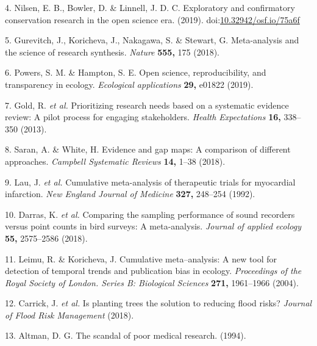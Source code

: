 \documentclass[]{article}
\begin{document}
\leavevmode\hypertarget{ref-nilsen_bowler_linnell_2019}{}%
4. Nilsen, E. B., Bowler, D. \& Linnell, J. D. C. Exploratory and
confirmatory conservation research in the open science era. (2019).
doi:\href{https://doi.org/10.32942/osf.io/75a6f}{10.32942/osf.io/75a6f}

\leavevmode\hypertarget{ref-gurevitch2018meta}{}%
5. Gurevitch, J., Koricheva, J., Nakagawa, S. \& Stewart, G.
Meta-analysis and the science of research synthesis. \emph{Nature}
\textbf{555,} 175 (2018).

\leavevmode\hypertarget{ref-powers2019open}{}%
6. Powers, S. M. \& Hampton, S. E. Open science, reproducibility, and
transparency in ecology. \emph{Ecological applications} \textbf{29,}
e01822 (2019).

\leavevmode\hypertarget{ref-gold2013prioritizing}{}%
7. Gold, R. \emph{et al.} Prioritizing research needs based on a
systematic evidence review: A pilot process for engaging stakeholders.
\emph{Health Expectations} \textbf{16,} 338--350 (2013).

\leavevmode\hypertarget{ref-saran2018evidence}{}%
8. Saran, A. \& White, H. Evidence and gap maps: A comparison of
different approaches. \emph{Campbell Systematic Reviews} \textbf{14,}
1--38 (2018).

\leavevmode\hypertarget{ref-lau1992cumulative}{}%
9. Lau, J. \emph{et al.} Cumulative meta-analysis of therapeutic trials
for myocardial infarction. \emph{New England Journal of Medicine}
\textbf{327,} 248--254 (1992).

\leavevmode\hypertarget{ref-darras2018comparing}{}%
10. Darras, K. \emph{et al.} Comparing the sampling performance of sound
recorders versus point counts in bird surveys: A meta-analysis.
\emph{Journal of applied ecology} \textbf{55,} 2575--2586 (2018).

\leavevmode\hypertarget{ref-leimu2004cumulative}{}%
11. Leimu, R. \& Koricheva, J. Cumulative meta--analysis: A new tool for
detection of temporal trends and publication bias in ecology.
\emph{Proceedings of the Royal Society of London. Series B: Biological
Sciences} \textbf{271,} 1961--1966 (2004).

\leavevmode\hypertarget{ref-carrick2018planting}{}%
12. Carrick, J. \emph{et al.} Is planting trees the solution to reducing
flood risks? \emph{Journal of Flood Risk Management} (2018).

\leavevmode\hypertarget{ref-altman1994scandal}{}%
13. Altman, D. G. The scandal of poor medical research. (1994).
\end{document}
